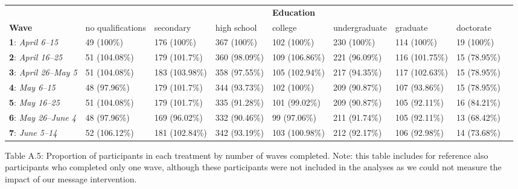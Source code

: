 \documentclass[authordate, empirical]{jote-new-article}
\begin{document}
	\begin{table}
		\begin{tabularx}{\linewidth}{@{} l l l l l l l l l @{}}
			\hline  &  &  &  & \textbf{Education} &  &  &  \\

			 \textbf{Wave} & no qualifications & secondary & high school & college &
			undergraduate & graduate & doctorate \\

			\hline \textbf{1}: \emph{April 6–15} & 49 (100\%) & 176 (100\%) & 367 (100\%)
			& 102 (100\%) & 230 (100\%) & 114 (100\%) & 19 (100\%) \\

			 \textbf{2}: \emph{April 16–25} & 51 (104.08\%) & 179 (101.7\%) & 360 (98.09\%)
			& 109 (106.86\%) & 221 (96.09\%) & 116 (101.75\%) & 15 (78.95\%) \\

			 \textbf{3}: \emph{April 26–May 5} & 51 (104.08\%) & 183 (103.98\%) & 358 (97.55\%)
			& 105 (102.94\%) & 217 (94.35\%) & 117 (102.63\%) & 15 (78.95\%) \\

			 \textbf{4}: \emph{May 6–15} & 48 (97.96\%) & 179 (101.7\%) & 344 (93.73\%) &
			102 (100\%) & 209 (90.87\%) & 107 (93.86\%) & 15 (78.95\%) \\

			 \textbf{5}: \emph{May 16–25} & 51 (104.08\%) & 179 (101.7\%) & 335 (91.28\%)
			& 101 (99.02\%) & 209 (90.87\%) & 105 (92.11\%) & 16 (84.21\%) \\

			 \textbf{6}: \emph{May 26–June 4} & 48 (97.96\%) & 169 (96.02\%) & 332 (90.46\%)
			& 99 (97.06\%) & 211 (91.74\%) & 105 (92.11\%) & 13 (68.42\%) \\

			 \textbf{7}: \emph{June 5–14} & 52 (106.12\%) & 181 (102.84\%) & 342 (93.19\%)
			& 103 (100.98\%) & 212 (92.17\%) & 106 (92.98\%) & 14 (73.68\%) \\


		\end{tabularx}
	\end{table}





	Table A.5: Proportion of participants in each treatment by number of waves completed. Note: this table includes for reference also participants who completed only one wave, although these participants were not included in the analyses as we could not measure the impact of our message intervention.
\end{document}
